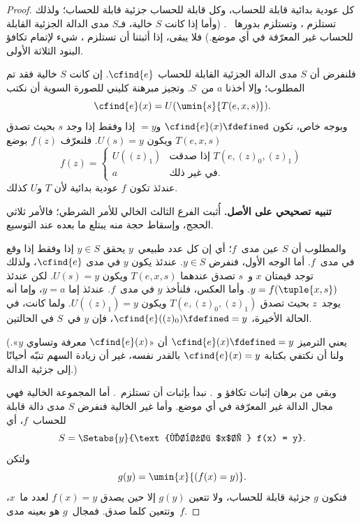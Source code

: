 \documentclass[../../../include/open-logic-section]{subfiles}
\begin{document}
\begin{proof}
كل عودية بدائية قابلة للحساب، وكل قابلة للحساب
جزئية قابلة للحساب؛ ولذلك  تستلزم
، وتستلزم  بدورها
~. (وأما إذا كانت $S$ خالية، فـ$S$ مدى الدالة
الجزئية القابلة للحساب غير المعرّفة في أي موضع.) فلا يبقى، إذا أثبتنا أن
 تستلزم ، شيء لإتمام تكافؤ
البنود الثلاثة الأولى.

فلنفرض أن $S$ مدى الدالة الجزئية القابلة للحساب $\cfind{e}$. إن
كانت $S$ خالية فقد تم المطلوب؛ وإلا أخذنا $a$ من~$S$. وتجيز مبرهنة
كليني للصورة السوية أن نكتب
\[
\cfind{e}(x) = U(\umin{s}{T(e, x, s)}).
\]
وبوجه خاص، تكون $\cfind{e}(x)\fdefined$ و$=y$ إذا وفقط إذا وجد $s$
بحيث تصدق $T(e,x,s)$ ويكون $U(s)=y$. فلنعرّف $f(z)$ بوضع
\[
f(z) = \begin{cases}
  U((z)_1) & \text{إذا صدقت $T(e, (z)_0, (z)_1)$} \\
  a        & \text{في غير ذلك.}
\end{cases}
\]
عندئذ تكون $f$ عودية بدائية لأن $T$ و$U$ كذلك.

\textbf{تنبيه تصحيحي على الأصل.} أُثبت الفرع الثالث الخالي للأمر
الشرطي؛ فالأمر ثلاثي الحجج، وإسقاط حجة منه يبتلع ما بعده عند
التوسيع.

والمطلوب أن $S$ عين مدى~$f$؛ أي إن كل عدد طبيعي~$y$ يحقق $y\in S$
إذا وفقط إذا وقع في مدى~$f$. أما الوجه الأول، فنفرض $y\in S$.
عندئذ يكون $y$ في مدى $\cfind{e}$، ولذلك توجد قيمتان $x$ و~$s$ تصدق
عندهما $T(e,x,s)$ ويكون $U(s)=y$. لكن عندئذ
$y=f(\tuple{x,s})$. وأما العكس، فلنأخذ $y$ في مدى~$f$. عندئذ إما
$y=a$، وإما أنه يوجد~$z$ بحيث تصدق $T(e,(z)_0,(z)_1)$ ويكون
$U((z)_1)=y$. ولما كانت، في الحالة الأخيرة،
$\cfind{e}((z)_0)\fdefined=y$، فإن $y$ في~$S$ في الحالتين.

(يعني الترميز $\cfind{e}(x)\fdefined=y$ أن «$\cfind{e}(x)$ معرفة
وتساوي $y$». ولنا أن نكتفي بكتابة $\cfind{e}(x)=y$ بالقدر نفسه، غير أن
زيادة السهم تنبّه أحيانًا إلى جزئية الدالة.)

وبقي من برهان  إثبات تكافؤ
 و~. نبدأ بإثبات أن
 تستلزم~. أما المجموعة الخالية فهي مجال الدالة غير المعرّفة في أي موضع. وأما غير الخالية فنفرض $S$ مدى دالة
قابلة للحساب~$f$، أي
\[
S = \Setabs{y}{\text{لبعض $x$، } f(x) = y}.
\]
ولتكن
\[
g(y) = \umin{x}{(f(x) = y)}.
\]
فتكون $g$ جزئية قابلة للحساب، ولا تتعين $g(y)$ إلا حين
يصدق $f(x)=y$ لعدد ما~$x$، وتتعين كلما صدق. فمجال~$g$ هو بعينه مدى~$f$.


\end{proof}
\end{document}
